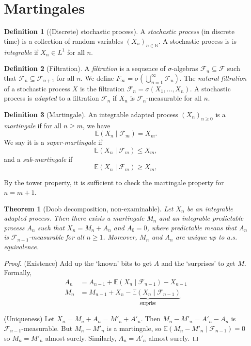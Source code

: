 \documentclass[parskip=full]{article}
\newtheorem{theorem}{Theorem}[section]
\theoremstyle{definition}
\newtheorem*{definition}{Definition}
\newcommand{\1}{\mathbbm{1}}
\newcommand{\E}{\mathbb{E}}
\begin{document}
\section{Martingales}
\begin{definition}[(Discrete) stochastic process]
    A \emph{stochastic process} (in discrete time) is a collection of random variables $(X_n)_{n \in \mathbb{N}}$. A stochastic process is is \emph{integrable} if $X_n \in L^1$ for all $n$.
\end{definition}
\begin{definition}[Filtration]
    A \emph{filtration} is a sequence of $\sigma$-algebras $\mathcal{F}_n \subseteq \mathcal{F}$ such that $\mathcal{F}_n \subseteq \mathcal{F}_{n+1}$ for all $n$. We define $F_\infty = \sigma(\bigcup_{n=1}^\infty \mathcal{F}_n).$ The \emph{natural filtration} of a stochastic process $X$ is the filtration $\mathcal{F}_n = \sigma(X_1, \ldots, X_n)$. A stochastic process is \emph{adapted} to a filtration $\mathcal{F}_n$ if $X_n$ is $\mathcal{F}_n$-measurable for all $n$.
\end{definition}

\begin{definition}[Martingale]
    An integrable adapted process $(X_n)_{n \geq 0}$ is a \emph{martingale} if for all $n \geq m$, we have
    \[
      \E(X_n \mid \mathcal{F}_m) = X_m.
    \]
    We say it is a \emph{super-martingale} if
    \[
      \E(X_n \mid \mathcal{F}_m) \leq X_m,
    \]
    and a \emph{sub-martingale} if
    \[
      \E(X_n \mid \mathcal{F}_m) \geq X_m,
    \]
\end{definition}
By the tower property, it is sufficient to check the martingale property for $n = m+1$.

\begin{theorem}[Doob decomposition, non-examinable]
  Let $X_n$ be an integrable adapted process. Then there exists a martingale $M_n$ and an integrable predictable process $A_n$ such that $X_n = M_n + A_n$ and $A_0 = 0$, where predictable means that $A_n$ is $\mathcal{F}_{n-1}$-measurable for all $n \geq 1$. Moreover, $M_n$ and $A_n$ are unique up to a.s. equivalence.
\end{theorem}

\begin{proof}
(Existence)
Add up the `known' bits to get $A$ and the `surprises' to get $M$. Formally,
\begin{align*}
    A_n &= A_{n-1} + \E(X_n \mid \mathcal{F}_{n-1}) - X_{n-1}\\
    M_n &= M_{n-1} + \underbrace{X_n - \E(X_n \mid \mathcal{F}_{n-1})}_{\text{surprise}}
\end{align*}

(Uniqueness) Let $X_n = M_n + A_n = M'_n + A'_n$. Then $M_n - M'_n = A'_n - A_n$ is $\mathcal{F}_{n-1}$-measurable. But $M_n - M'_n$ is a martingale, so $\E(M_n - M'_n \mid \mathcal{F}_{n-1}) = 0$ so $M_n = M'_n$ almost surely. Similarly, $A_n = A'_n$ almost surely.
\end{proof}
\end{document}
